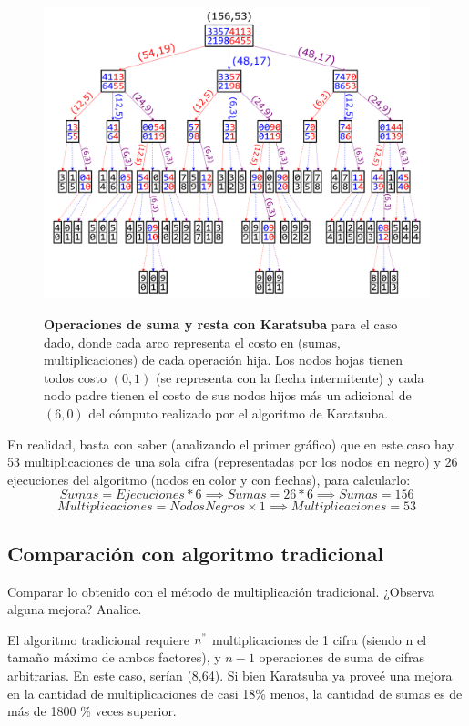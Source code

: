 \documentclass[titlepage,a4paper]{article}
\begin{document}
\begin{figure}[H]
    \centering
    \includegraphics[width=\textwidth,angle=90,origin=c]{KaratsubaOps.png}
    \caption{\label{fig:operaciones}}\textbf{Operaciones de suma y resta con Karatsuba} para el caso dado,
    donde cada arco representa el costo en (sumas, multiplicaciones) de cada operación hija. Los nodos
    hojas tienen todos costo $(0,1)$ (se representa con la flecha intermitente) y cada nodo padre tienen
    el costo de sus nodos hijos más un adicional de $(6,0)$ del cómputo realizado por el algoritmo de Karatsuba.
    \end{figure}

En realidad, basta con saber (analizando el primer gráfico) que en este caso hay 53 multiplicaciones de
una sola cifra (representadas por los nodos en negro) y 26 ejecuciones del algoritmo (nodos en color y
con flechas), para calcularlo:
$$Sumas = Ejecuciones * 6 \implies Sumas = 26 * 6 \implies \boxed{Sumas = 156}$$
$$Multiplicaciones = NodosNegros \times 1 \implies \boxed{Multiplicaciones = 53}$$

\subsection{Comparación con algoritmo tradicional}
\begin{tcolorbox}[colback=blue!5!white,colframe=blue!75!black,title=Enunciado 1.3]
    Comparar lo obtenido con el método de multiplicación tradicional. ¿Observa alguna mejora? Analice.
\end{tcolorbox}

El algoritmo tradicional requiere $n^"$ multiplicaciones de 1 cifra (siendo n el tamaño máximo de ambos
factores), y $n-1$ operaciones de suma de cifras arbitrarias. En este caso, serían (8,64). Si bien Karatsuba
ya proveé una mejora en la cantidad de multiplicaciones de casi 18\% menos, la cantidad de sumas es de más
de 1800 \% veces superior.
\end{document}
